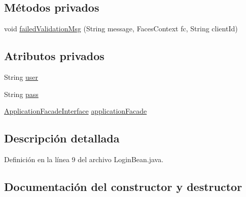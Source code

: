 \subsection*{Métodos privados}
\begin{DoxyCompactItemize}
\item 
void \mbox{\hyperlink{classcom_1_1ruralhousejsf_1_1model_1_1login_1_1_login_bean_a79fa6a37fba3ce108e71cb637bf899a0}{failed\+Validation\+Msg}} (String message, Faces\+Context fc, String client\+Id)
\end{DoxyCompactItemize}
\subsection*{Atributos privados}
\begin{DoxyCompactItemize}
\item 
String \mbox{\hyperlink{classcom_1_1ruralhousejsf_1_1model_1_1login_1_1_login_bean_a06e00e34aacd95ab04a33bae5bc50b34}{user}}
\item 
String \mbox{\hyperlink{classcom_1_1ruralhousejsf_1_1model_1_1login_1_1_login_bean_a4abf487aa0d370809a4f737dd87dbdd7}{pass}}
\item 
\mbox{\hyperlink{interfacecom_1_1ruralhousejsf_1_1business_logic_1_1_application_facade_interface}{Application\+Facade\+Interface}} \mbox{\hyperlink{classcom_1_1ruralhousejsf_1_1model_1_1login_1_1_login_bean_aba818fddb0e4c1e484f5a336e9cedd40}{application\+Facade}}
\end{DoxyCompactItemize}


\subsection{Descripción detallada}


Definición en la línea 9 del archivo Login\+Bean.\+java.



\subsection{Documentación del constructor y destructor}
\mbox{\label{classcom_1_1ruralhousejsf_1_1model_1_1login_1_1_login_bean_ae77b2f684ab6b7fc6f4fd4274ccd2c84}} 
